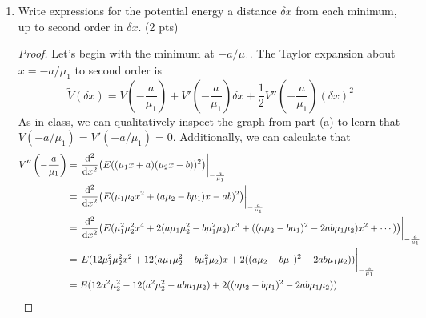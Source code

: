 \documentclass[../psets.tex]{subfiles}
\begin{document}
\begin{enumerate}
\begin{enumerate}
\begin{proof}
\begin{center}
            \end{center}
        \end{proof}
        \item Write expressions for the potential energy a distance $\delta x$ from each minimum, up to second order in $\delta x$. (2 pts)
        \begin{proof}
            Let's begin with the minimum at $-a/\mu_1$. The Taylor expansion about $x=-a/\mu_1$ to second order is
            \begin{equation*}
                \tilde{V}(\delta x) = V\left( -\frac{a}{\mu_1} \right)+V'\left( -\frac{a}{\mu_1} \right)\delta x+\frac{1}{2}V''\left( -\frac{a}{\mu_1} \right)(\delta x)^2
            \end{equation*}
            As in class, we can qualitatively inspect the graph from part (a) to learn that $V(-a/\mu_1)=V'(-a/\mu_1)=0$. Additionally, we can calculate that
            \begin{align*}
                V''\left( -\frac{a}{\mu_1} \right) &= \eval{\dv[2]{x}(E((\mu_1x+a)(\mu_2x-b))^2)}_{-\frac{a}{\mu_1}}\\
                &= \eval{\dv[2]{x}(E(\mu_1\mu_2x^2+(a\mu_2-b\mu_1)x-ab)^2)}_{-\frac{a}{\mu_1}}\\
                &= \eval{\dv[2]{x}(E(\mu_1^2\mu_2^2x^4+2(a\mu_1\mu_2^2-b\mu_1^2\mu_2)x^3+((a\mu_2-b\mu_1)^2-2ab\mu_1\mu_2)x^2+\cdots))}_{-\frac{a}{\mu_1}}\\
                &= \eval{E(12\mu_1^2\mu_2^2x^2+12(a\mu_1\mu_2^2-b\mu_1^2\mu_2)x+2((a\mu_2-b\mu_1)^2-2ab\mu_1\mu_2))}_{-\frac{a}{\mu_1}}\\
                &= E(12a^2\mu_2^2-12(a^2\mu_2^2-ab\mu_1\mu_2)+2((a\mu_2-b\mu_1)^2-2ab\mu_1\mu_2))\\

\end{align*}
\end{proof}
\end{enumerate}
\end{enumerate}
\end{document}
